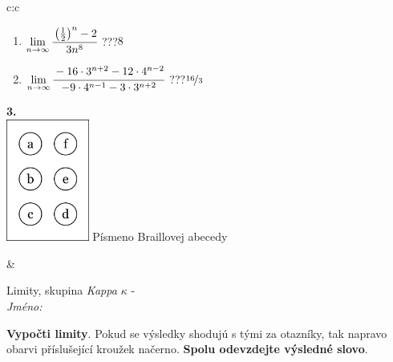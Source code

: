\documentclass[10pt]{report}
\begin{document}
\begin{tabular}{c:c}
\begin{minipage}[c][104.5mm][t]{0.5\linewidth}
\begin{center}
\begin{minipage}{0.79\linewidth}
\begin{center}
\begin{varwidth}{\linewidth}
\begin{enumerate}
\item $\lim\limits_{n\to\infty}\cfrac{\left(\frac{1}{2}\right)^n -2}{3n^{8}}$\quad \dotfill\; ???\;\dotfill \quad $8$
\item $\lim\limits_{n\to\infty}\cfrac{-16\cdot 3^{n+2}-12\cdot 4^{n-2}}{-9\cdot 4^{n-1}-3\cdot 3^{n+2}}$\quad \dotfill\; ???\;\dotfill \quad $\nicefrac{16}{3}$
\end{enumerate}
\end{varwidth}
\end{center}
\end{minipage}
\begin{minipage}{0.20\linewidth}
\begin{center}
{\Huge\bfseries 3.} \\[2mm]
\includegraphics[height=40mm]{../images/braille.png}
{\small Písmeno Braillovej abecedy}
\end{center}
\end{minipage}
\end{center}
\end{minipage}
&
\begin{minipage}[c][104.5mm][t]{0.5\linewidth}
\begin{center}
\vspace{7mm}
{\huge Limity, skupina \textit{Kappa $\kappa$} -}\\[5mm]
\textit{Jméno:}\phantom{xxxxxxxxxxxxxxxxxxxxxxxxxxxxxxxxxxxxxxxxxxxxxxxxxxxxxxxxxxxxxxxxx}\\[5mm]
\begin{minipage}{0.95\linewidth}
\begin{center}
\textbf{Vypočti limity}. Pokud se výsledky shodujú s tými za otazníky, tak napravo\\obarvi příslušející kroužek načerno. \textbf{Spolu odevzdejte výsledné slovo}.
\end{center}
\end{minipage}
\\[1mm]
\begin{minipage}{0.79\linewidth}
\begin{center}
\begin{varwidth}{\linewidth}

\end{varwidth}
\end{center}
\end{minipage}
\end{center}
\end{minipage}
\end{tabular}
\end{document}
